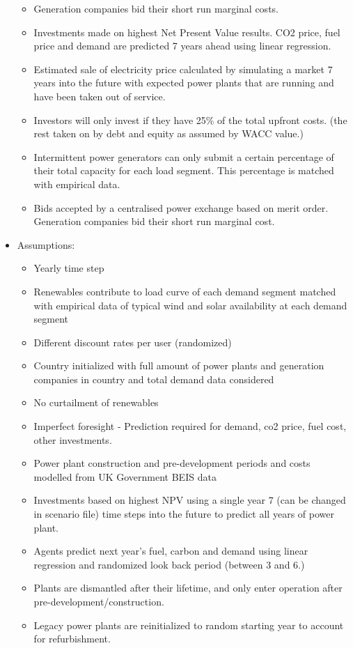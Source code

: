 \begin{itemize}
\begin{itemize}
		\item Generation companies bid their short run marginal costs.
		\item Investments made on highest Net Present Value results. CO2 price, fuel price and demand are predicted 7 years ahead using linear regression. 
		\item Estimated sale of electricity price calculated by simulating a market 7 years into the future with expected power plants that are running and have been taken out of service.
		\item Investors will only invest if they have 25\% of the total upfront costs. (the rest taken on by debt and equity as assumed by WACC value.)
		\item Intermittent power generators can only submit a certain percentage of their total capacity for each load segment. This percentage is matched with empirical data.
		\item Bids accepted by a centralised power exchange based on merit order. Generation companies bid their short run marginal cost.
	\end{itemize}
	\item Assumptions: 
	\begin{itemize}
		\item Yearly time step
		\item Renewables contribute to load curve of each demand segment matched with empirical data of typical wind and solar availability at each demand segment
		\item Different discount rates per user (randomized)
		\item Country initialized with full amount of power plants and generation companies in country and total demand data considered
		\item No curtailment of renewables
		\item Imperfect foresight - Prediction required for demand, co2 price, fuel cost, other investments.
		\item Power plant construction and pre-development periods and costs modelled from UK Government BEIS data
		\item Investments based on highest NPV using a single year 7 (can be changed in scenario file) time steps into the future to predict all years of power plant.
		\item Agents predict next year's fuel, carbon and demand using linear regression and randomized look back period (between 3 and 6.)
		\item Plants are dismantled after their lifetime, and only enter operation after pre-development/construction.
		\item Legacy power plants are reinitialized to random starting year to account for refurbishment.
		\end{itemize}
\end{itemize}